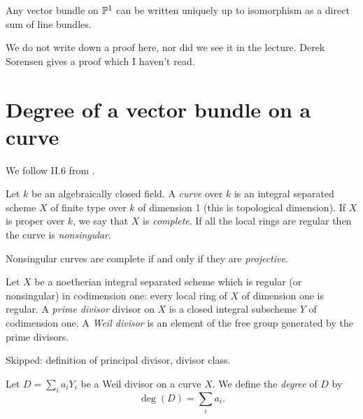 \begin{theorem}
	Any vector bundle on $\mathbb{P}^1$ can be written uniquely up to isomorphism as a direct sum of line bundles. 
\end{theorem}

We do not write down a proof here, nor did we see it in the lecture. Derek Sorensen gives a proof \cite{sorensen_classication_nodate} which I haven't read.



\section{Degree of a vector bundle on a curve}
We follow II.6 from \cite{hartshorne2013algebraic}.

\begin{definition}
	Let $k$ be an algebraically closed field. A \emph{curve} over $k$ is an integral separated scheme $X$ of finite type over $k$ of dimension 1 (this is topological dimension). If $X$ is proper over $k$, we say that $X$ is \emph{complete}. If all the local rings are regular then the curve is \emph{nonsingular}.
\end{definition}

Nonsingular curves are complete if and only if they are \emph{projective}.

\begin{definition}
	Let $X$ be a noetherian integral separated scheme which is regular (or nonsingular) in codimension one: every local ring of $X$ of dimension one is regular. A \emph{prime divisor} divisor on $X$ is a closed integral subscheme $Y$ of codimension one. A \emph{Weil divisor} is an element of the free group generated by the prime divisors. 
\end{definition}

Skipped: definition of principal divisor, divisor class.
\begin{definition}
	Let $D = \sum_i a_i Y_i$ be a Weil divisor on a curve $X$. We define the \emph{degree} of $D$ by \[
    	\deg(D) = \sum_i a_i.
    \]
\end{definition}



